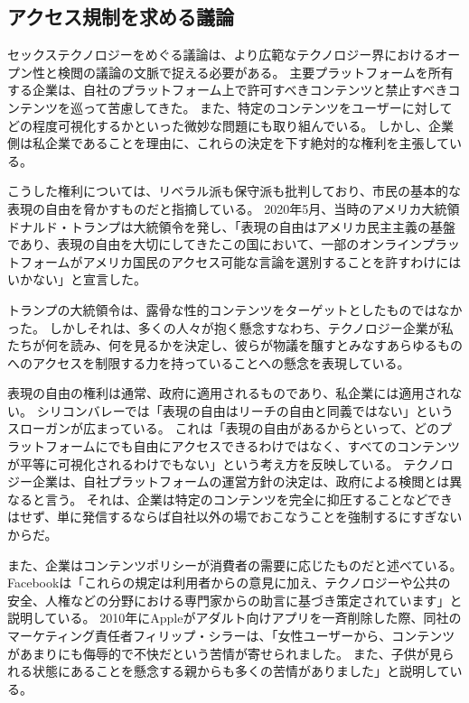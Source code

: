 \documentclass[paper=a4,book,openany]{jlreq} \usepackage{mystyle}
\begin{document}
\subsection{アクセス規制を求める議論}

セックステクノロジーをめぐる議論は、より広範なテクノロジー界におけるオープン性と検閲の議論の文脈で捉える必要がある。
主要プラットフォームを所有する企業は、自社のプラットフォーム上で許可すべきコンテンツと禁止すべきコンテンツを巡って苦慮してきた。
また、特定のコンテンツをユーザーに対してどの程度可視化するかといった微妙な問題にも取り組んでいる\citep{economist20:_social_medias_strug_self}。
しかし、企業側は私企業であることを理由に、これらの決定を下す絶対的な権利を主張している。

こうした権利については、リベラル派も保守派も批判しており、市民の基本的な表現の自由を脅かすものだと指摘している。
2020年5月、当時のアメリカ大統領ドナルド・トランプは大統領令を発し、「表現の自由はアメリカ民主主義の基盤であり、表現の自由を大切にしてきたこの国において、一部のオンラインプラットフォームがアメリカ国民のアクセス可能な言論を選別することを許すわけにはいかない」と宣言した\citep{house20:_execut_order_preven_onlin_censor,lakier21:_great_free_speec_rever}。

トランプの大統領令は、露骨な性的コンテンツをターゲットとしたものではなかった。
しかしそれは、多くの人々が抱く懸念{\DDASH}すなわち、テクノロジー企業が私たちが何を読み、何を見るかを決定し、彼らが物議を醸すとみなすあらゆるものへのアクセスを制限する力を持っていることへの懸念{\DDASH}を表現している。

表現の自由の権利は通常、政府に適用されるものであり、私企業には適用されない。
シリコンバレーでは「表現の自由はリーチの自由と同義ではない」というスローガンが広まっている。
これは「表現の自由があるからといって、どのプラットフォームにでも自由にアクセスできるわけではなく、すべてのコンテンツが平等に可視化されるわけでもない」という考え方を反映している。
テクノロジー企業は、自社プラットフォームの運営方針の決定は、政府による検閲とは異なると言う。
それは、企業は特定のコンテンツを完全に抑圧することなどできはせず、単に発信するならば自社以外の場でおこなうことを強制するにすぎないからだ。

また、企業はコンテンツポリシーが消費者の需要に応じたものだと述べている。
Facebookは「これらの規定は利用者からの意見に加え、テクノロジーや公共の安全、人権などの分野における専門家からの助言に基づき策定されています」と説明している\citep{facebook25:_commun_stand}。
2010年にAppleがアダルト向けアプリを一斉削除した際、同社のマーケティング責任者フィリップ・シラーは、「女性ユーザーから、コンテンツがあまりにも侮辱的で不快だという苦情が寄せられました。
また、子供が見られる状態にあることを懸念する親からも多くの苦情がありました」と説明している\citep{wortham10:_apple_bans_some_apps_sex_tinged_conten}。
\end{document}
